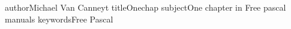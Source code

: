 \documentclass{report}
\begin{document}
%
%
%
%
%
%
%
%

%
%
%
\pdfinfo
author{Michael Van Canneyt}
title{Onechap}
subject{One chapter in Free pascal manuals}
keywords{Free Pascal}
\end{document}
